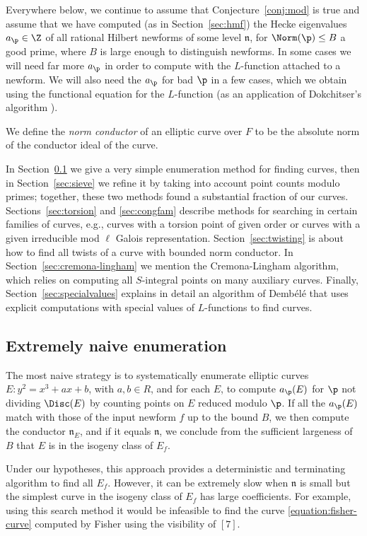 \documentclass{amsart}
\newcommand{\n}{\mathfrak{n}}
\newcommand{\dembele}{Demb\'el{\'e}\xspace}
\begin{document}
Everywhere below, we continue to assume that Conjecture~\ref{conj:mod}
is true and assume that we have computed (as in Section~\ref{sec:hmf})
the Hecke eigenvalues $a_\p\in \Z$ of all rational Hilbert newforms of
some level $\n$, for $\Norm(\p)\leq B$ a good prime, where $B$ is
large enough to distinguish newforms. In some cases we will need far
more $a_{\p}$ in order to compute with the $L$-function attached to a
newform.  We will also need the $a_{\p}$ for bad $\p$ in a few cases,
which we obtain using the functional equation for the $L$-function (as
an application of Dokchitser's algorithm \cite{dokchitser:lfun}).

We define the {\em norm conductor} of an elliptic curve over $F$ to be
the absolute norm of the conductor ideal of the curve.

In Section~\ref{sec:naive} we give a very simple enumeration method
for finding curves, then in Section~\ref{sec:sieve} we refine it by
taking into account point counts modulo primes; together, these two
methods found a substantial fraction of our curves.
Sections~\ref{sec:torsion} and \ref{sec:congfam} describe methods for
searching in certain families of curves, e.g., curves with a torsion
point of given order or curves with a given irreducible mod $\ell$
Galois representation.  Section~\ref{sec:twisting} is about how to
find all twists of a curve with bounded norm conductor.  In
Section~\ref{sec:cremona-lingham} we mention the Cremona-Lingham
algorithm, which relies on computing all $S$-integral points on many
auxiliary curves.  Finally, Section~\ref{sec:specialvalues} explains
in detail an algorithm of \dembele{} that uses  explicit
computations with special values of $L$-functions to find curves.


\subsection{Extremely naive enumeration}\label{sec:naive}

The most naive strategy is to systematically enumerate 
 elliptic curves $E: y^2 = x^3 + ax + b$, with $a,b\in R$,
and for each $E$, to compute $a_\p(E)$ for $\p$ not dividing $\Disc(E)$
 by counting points on $E$ reduced modulo $\p$.  If all the $a_\p(E)$ match
 with those of the input newform $f$ up to the bound $B$, we then compute
 the conductor $\n_E$, and if it equals $\n$, we conclude from the sufficient 
largeness of $B$ that $E$ is in the isogeny class of $E_f$.

Under our hypotheses, this approach provides a deterministic and 
terminating algorithm to find all $E_f$. However, it can be extremely slow
 when $\n$ is small but the simplest curve in the isogeny class 
of $E_f$ has large coefficients.  For example, using this search method it would be
infeasible to find the curve \eqref{equation:fisher-curve} computed by Fisher using the
visibility of \Sha$[7]$.
\end{document}
